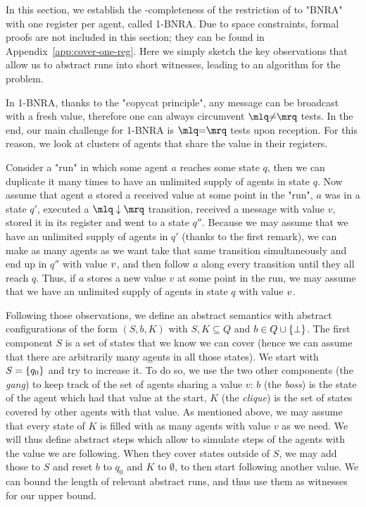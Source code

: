 In this section, we establish the \NP-completeness of the restriction of \COVER to "BNRA" with one register per agent, called 1-BNRA. Due to space constraints, formal proofs are not included in this section; they can be found in Appendix~\ref{app:cover-one-reg}. Here we simply sketch the key observations that allow us to abstract runs into short witnesses, leading to an \NP algorithm for the problem.
	
	In 1-BNRA, thanks to the "copycat principle", any  message can be broadcast with a fresh value, therefore one can always circumvent $\quotemarks{\diseqtestact}$ tests. In the end, our main challenge for 1-BNRA is $\quotemarks{\eqtestact}$ tests upon reception.
	For this reason, we look at clusters of agents that share the value in their registers. 

	Consider a "run" in which some agent $a$ reaches some state $q$, then we can duplicate it many times to have an unlimited supply of agents in state $q$.
	Now assume that agent $a$ stored a received value at some point in the "run", $a$ was in a state $q'$, executed a $\quotemarks{\enregact}$ transition, received a message with value $v$, stored it in its register and went to a state $q''$. 
	Because we may assume that we have an unlimited supply of agents in $q'$ (thanks to the first remark), we can make as many agents as we want take that same transition simultaneously and end up in $q''$ with value $v$, and then follow $a$ along every transition until they all reach $q$. 
	Thus, if $a$ stores a new value $v$ at some point in the run, we may assume that we have an unlimited supply of agents in state $q$ with value $v$. 
	
	Following those observations, we define an abstract semantics with abstract configurations of the form $(S, b, K)$ with $S, K \subseteq Q$ and $b \in Q \cup \{\bot\}$. The first component $S$ is a set of states that we know we can cover (hence we can assume that there are arbitrarily many agents in all those states).
	We start with $S = \{q_0\}$ and try to increase it. To do so, we use the two other components (the \emph{gang}) to keep track of the set of agents sharing a value $v$: $b$ (the \emph{boss}) is the state of the agent which had that value at the start, $K$ (the \emph{clique}) is the set of states covered by other agents with that value. As mentioned above, we may assume that every state of $K$ is filled with as many agents with value $v$ as we need. 
	We will thus define abstract steps which allow to simulate steps of the agents with the value we are following. When they cover states outside of $S$, we may add those to $S$ and reset $b$ to $q_0$ and $K$  to $\emptyset$, to then start following another value.
	We can bound the length of relevant abstract runs, and thus use them as witnesses for our \NP upper bound.
	
